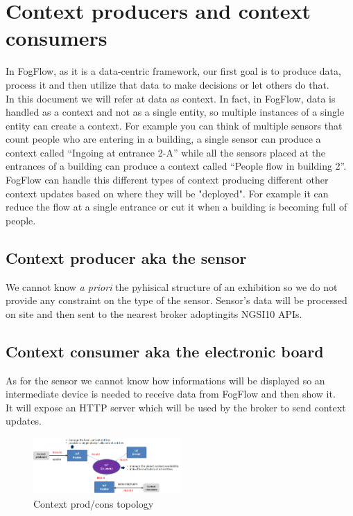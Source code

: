 \documentclass[conference]{ieeeconf}
\begin{document}
\section{Context producers and context consumers}
In FogFlow, as it is a data-centric framework, our first goal is to produce data, process it and then utilize that data to make decisions or let others do that.\\
In this document we will refer at data as context. In fact, in FogFlow, data is handled as a context and not as a single entity, so multiple instances of a single entity can create a context.
For example you can think of multiple sensors that count people who are entering in a building, a single sensor can produce a context called “Ingoing at entrance 2-A” while all the sensors placed at the entrances of a building can produce a context called “People flow in building 2”.
FogFlow can handle this different types of context producing different other context updates based on where they will be "deployed". For example it can reduce the flow at a single entrance or cut it when a building is becoming full of people.
\subsection{Context producer aka the sensor}
We cannot know \textit{a priori} the pyhisical structure of an exhibition so we do not provide any constraint on the type of the sensor.
Sensor's data will be processed on site and then sent to the nearest broker adoptingits  NGSI10 APIs.

\subsection{Context consumer aka the electronic board}
As for the sensor we cannot know how informations will be displayed so an intermediate device is needed to receive data from FogFlow and then show it.\\
It will expose an HTTP server which will be used by the broker to send context updates.
\begin{figure}[ht]
    \centering
    \includegraphics[width=0.5\textwidth]{Images/distributed-brokers.png}
    \caption{Context prod/cons topology}
\end{figure}{}
\end{document}
